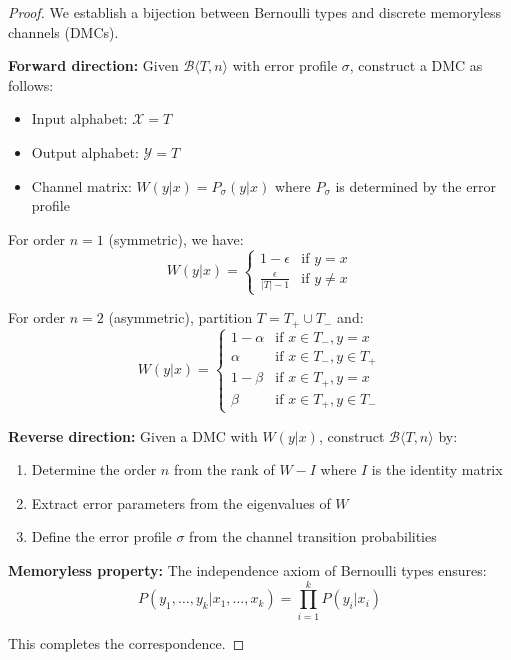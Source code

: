 \documentclass[11pt,final,hidelinks]{article}
\newcommand{\bernoulli}[2]{\mathcal{B}\langle #1, #2 \rangle}
\begin{document}
\begin{proof}
We establish a bijection between Bernoulli types and discrete memoryless channels (DMCs).

\textbf{Forward direction:} Given $\bernoulli{T}{n}$ with error profile $\sigma$, construct a DMC as follows:
\begin{itemize}
    \item Input alphabet: $\mathcal{X} = T$
    \item Output alphabet: $\mathcal{Y} = T$
    \item Channel matrix: $W(y|x) = P_\sigma(y|x)$ where $P_\sigma$ is determined by the error profile
\end{itemize}

For order $n = 1$ (symmetric), we have:
\begin{equation}
W(y|x) = \begin{cases}
1 - \epsilon & \text{if } y = x \\
\frac{\epsilon}{|T| - 1} & \text{if } y \neq x
\end{cases}
\end{equation}

For order $n = 2$ (asymmetric), partition $T = T_+ \cup T_-$ and:
\begin{equation}
W(y|x) = \begin{cases}
1 - \alpha & \text{if } x \in T_-, y = x \\
\alpha & \text{if } x \in T_-, y \in T_+ \\
1 - \beta & \text{if } x \in T_+, y = x \\
\beta & \text{if } x \in T_+, y \in T_-
\end{cases}
\end{equation}

\textbf{Reverse direction:} Given a DMC with $W(y|x)$, construct $\bernoulli{T}{n}$ by:
\begin{enumerate}
    \item Determine the order $n$ from the rank of $W - I$ where $I$ is the identity matrix
    \item Extract error parameters from the eigenvalues of $W$
    \item Define the error profile $\sigma$ from the channel transition probabilities
\end{enumerate}

\textbf{Memoryless property:} The independence axiom of Bernoulli types ensures:
\begin{equation}
P(y_1, \ldots, y_k | x_1, \ldots, x_k) = \prod_{i=1}^k P(y_i | x_i)
\end{equation}

This completes the correspondence.
\end{proof}
\end{document}
